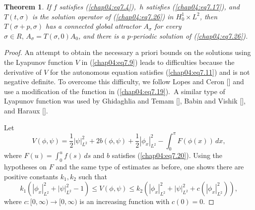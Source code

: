 \documentclass{surv-l}
\theoremstyle{plain}
\newtheorem{theorem}{Theorem}[section]
\theoremstyle{definition}
\numberwithin{equation}{section}
\numberwithin{figure}{chapter}
\begin{document}
\begin{theorem}\label{thm4.7.9} If $f$ satisfies \emph{(\ref{chap04:eq7.4})},\, $h$ satisfies \emph{(\ref{chap04:eq7.17})}, and $T(t, \sigma)$ is the solution operator of \emph{(\ref{chap04:eq7.26})} in $H_{0}^{1}\times L^{2}$, then $T(\sigma+p, \sigma)$ has a connected global attractor $A_{\sigma}$ for every $\sigma\in R,\, A_{\sigma}=T(\sigma, 0)A_{0}$, and there is a $p$-periodic solution of \emph{(\ref{chap04:eq7.26})}.
\end{theorem}

\begin{proof} An attempt to obtain the necessary a priori bounds on the solutions using the Lyapunov function $V$ in (\ref{chap04:eq7.9}) leads to difficulties because the derivative of $V$ for the autonomous equation satisfies (\ref{chap04:eq7.11}) and is not negative definite. To overcome this difficulty, we follow Lopes and Ceron [\citeyear{1984lc}] and use a modification of the function in (\ref{chap04:eq7.19}).\, A similar type of Lyapunov function was used by Ghidaghlia and Temam [\citeyear{1985gt}], Babin and Vishik [\citeyear{1985bv}], and Haraux [\citeyear{1985haraux}].

Let
\begin{equation}\label{chap04:eq7.27}
V(\phi,\psi)=\frac{1}{2}|\psi|_{L^{2}}^{2}+2b(\phi,\psi)+\frac{1}{2}|\phi_{x}|^{2}_{L^{2}}-\int_{0}^{\pi}F(\phi(x))\, dx,
\end{equation}
where $F(u)=\int_{0}^{u}f(s)\,ds$ and $b$ satisfies (\ref{chap04:eq7.20}). Using the hypotheses on $F$ and the same type of estimates as before, one shows there are positive constants $k_{1}, k_{2}$ such that
\begin{equation}\label{chap04:eq7.28}
k_{1}(|\phi_{x}|_{L^{2}}^{2}+|\psi|_{L^{2}}^{2}-1)\leq V(\phi, \psi)\leq k_{2}(|\phi_{x}|_{L^{2}}^{2}+|\psi|_{L^{2}}^{2}+c(|\phi_{x}|_{L^{2}}^{2})),
\end{equation}
where $c\!:[0, \infty)\rightarrow[0, \infty)$ is an increasing function with $c(0)=0$.


\end{proof}
\end{document}
